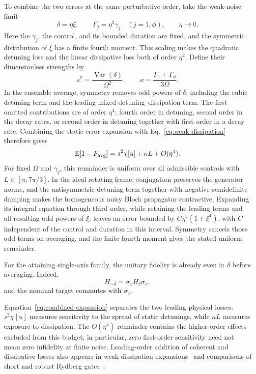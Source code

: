 \documentclass[12pt]{iopjournal}
\begin{document}
To combine the two errors at the same perturbative order, take the
weak-noise limit
\begin{equation*}
 \delta=\eta\xi,\qquad
 \Gamma_j=\eta^2\gamma_j\quad(j=1,\phi),\qquad \eta\to0.
\end{equation*}
Here the $\gamma_j$, the control, and its bounded duration are fixed,
and the symmetric distribution of $\xi$ has a finite fourth moment.
This scaling makes the quadratic detuning loss and the linear
dissipative loss both of order $\eta^2$. Define their dimensionless
strengths by
\begin{equation}
 s^2=\frac{\operatorname{Var}(\delta)}{\Omega^2},
 \qquad
 \kappa=\frac{\Gamma_1+\Gamma_\phi}{3\Omega}.
 \label{eq:noise-parameters}
\end{equation}
In the ensemble average, symmetry removes odd powers of $\delta$,
including the cubic detuning term and the leading mixed
detuning--dissipation term. The first omitted contributions are of
order $\eta^4$: fourth order in detuning, second order in the decay
rates, or second order in detuning together with first order in a
decay rate. Combining the static-error expansion with
Eq.~\eqref{eq:weak-dissipation} therefore gives
\begin{equation}
 \mathbb E[1-F_{\rm avg}]
 =s^2\chi[u]+\kappa L+O(\eta^4).
 \label{eq:combined-expansion}
\end{equation}
For fixed $\Omega$ and $\gamma_j$, this remainder is uniform over all
admissible controls with $L\in[\pi,7\pi/3]$.
In the ideal rotating frame, conjugation preserves the generator norms,
and the antisymmetric detuning term together with negative-semidefinite
damping makes the homogeneous noisy Bloch propagator contractive.
Expanding its integral equation through third order, while retaining
the leading terms and all resulting odd powers of $\xi$, leaves an
error bounded by $C\eta^4(1+\xi^4)$, with $C$ independent of the control
and duration in this interval.
Symmetry cancels those odd terms on averaging, and the finite fourth
moment gives the stated uniform remainder.

For the attaining single-axis family, the unitary fidelity is already
even in $\delta$ before averaging. Indeed,
\begin{equation*}
 H_{-\delta}=\sigma_xH_\delta\sigma_x,
\end{equation*}
and the nominal target commutes with $\sigma_x$.

Equation~\eqref{eq:combined-expansion} separates the two leading
physical losses: $s^2\chi[u]$ measures sensitivity to the spread of
static detunings, while $\kappa L$ measures exposure to dissipation.
The $O(\eta^4)$ remainder contains the higher-order effects excluded
from this budget; in particular, zero first-order sensitivity need
not mean zero infidelity at finite noise. Leading-order addition of
coherent and dissipative losses also appears in weak-dissipation
expansions~\cite{abad2022} and comparisons of short and robust
Rydberg gates~\cite{fromonteil2023}.
\end{document}
